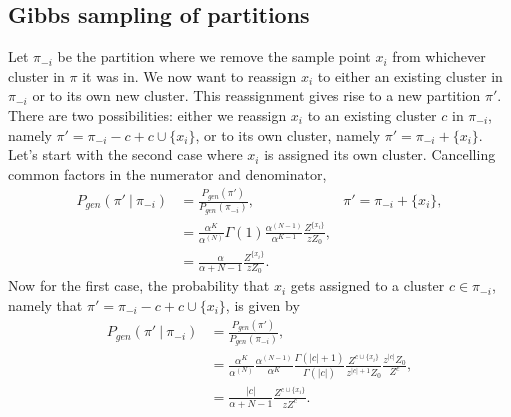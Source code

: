 \documentclass[11pt, oneside]{article}   	%
\begin{document}
\subsection{Gibbs sampling of partitions}
Let $\pi_{-i}$ be the partition where we remove the sample point $x_i$ from whichever cluster in $\pi$ it was in. We now want to reassign $x_i$ to either an existing cluster in $\pi_{-i}$ or to its own new cluster. This reassignment gives rise to a new partition $\pi'$. There are two possibilities: either we reassign $x_i$ to an existing cluster $c$ in $\pi_{-i}$, namely $\pi' = \pi_{-i} - c + c\cup\lbrace x_i\rbrace$, or to its own cluster, namely $\pi' = \pi_{-i} + \lbrace x_i\rbrace$. Let's start with the second case where $x_i$ is assigned its own cluster. Cancelling common factors in the numerator and denominator,
\begin{equation}\begin{aligned}
P_{gen}(\pi'~\vert~\pi_{-i}) &= \frac{P_{gen}(\pi')}{P_{gen}(\pi_{-i})}, &  \pi' = \pi_{-i} + \lbrace x_i\rbrace,\\
&=\frac{\alpha^K}{\alpha^{(N)}}\Gamma(1)\frac{\alpha^{(N-1)}}{\alpha^{K-1}}\frac{Z^{\lbrace x_i\rbrace}}{z Z_0 },\\
&= \frac{\alpha}{\alpha + N - 1}\frac{Z^{\lbrace x_i\rbrace}}{zZ_0}.
\end{aligned}\label{eq:gibbsnewcluster}\end{equation}
Now for the first case, the probability that $x_i$ gets assigned to a cluster $c\in\pi_{-i}$, namely that $\pi' = \pi_{-i} - c + c\cup\lbrace x_i\rbrace$, is given by
\begin{equation}\begin{split}
P_{gen}(\pi'~\vert~\pi_{-i}) &= \frac{P_{gen}(\pi')}{P_{gen}(\pi_{-i})}, \\
&=\frac{\alpha^K}{\alpha^{(N)}}\frac{\alpha^{(N-1)}}{\alpha^{K}}\frac{\Gamma(\vert c\vert+1)}{\Gamma(\vert c\vert)}\frac{Z^{c\cup\lbrace x_i\rbrace}}{z^{\vert c\vert + 1}Z_0}\frac{z^{\vert c\vert} Z_0}{Z^{c}},\\
&= \frac{\vert c\vert}{\alpha + N - 1}\frac{Z^{c\cup\lbrace x_i\rbrace}}{z Z^c}.
\end{split}\label{eq:gibbsoldcluster}\end{equation}
\end{document}

